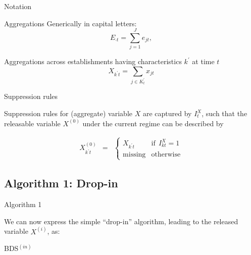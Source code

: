 \begin{frame}{Notation}
\begin{block}{Aggregations}
Generically in capital letters:
\begin{equation}
\label{eq:national_e}
E_{\cdot t} = \sum_{j=1}^J e_{jt},
\end{equation}

Aggregations across establishments having characteristics $k^\prime$ at 
time $t$
\begin{equation}
\label{eq:sum_X}
X_{k^\prime t} =  \sum_{j \in K_t^\prime} x_{jt}
\end{equation}
\end{block}
\end{frame}

\begin{frame}{Suppression rules }
\begin{block}{Suppression rules}
for (aggregate) variable $X$ are captured by $I_{t}^X$, such that the 
releasable variable $X^{(0)}$  under the current regime can be described by

\begin{eqnarray}
\label{eq:supp_x}
X_{k^\prime t}^{(0)} &=& \left \lbrace 
\begin{array}{rl}
X_{k^\prime t} &\mbox{if}~~  I_{kt}^X = 1 \\
\mbox{missing} &\mbox{otherwise}
\end{array} \right .
\end{eqnarray}
\end{block}
\end{frame}



\subsection{Algorithm 1: Drop-in}
\begin{frame}[fragile]{Algorithm 1}

We can now express the simple ``drop-in'' algorithm, leading to the released variable $X^{(i)}$, 
as:
\begin{block}{BDS$^{(in)}$}
\begin{algorithm}
\begin{algorithmic}
\Else
\EndIf
\end{algorithmic}
\end{algorithm}
\end{block}
\end{frame}

